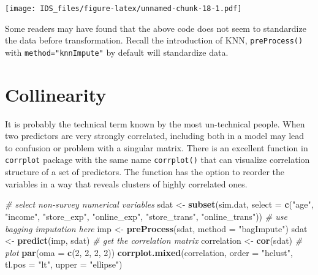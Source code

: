 \documentclass[12pt,]{krantz}
\makeatletter
\newenvironment{Shaded}{\begin{snugshade}}{\end{snugshade}}
\newcommand{\CommentTok}[1]{\textcolor[rgb]{0.37,0.37,0.37}{\textit{#1}}}
\newcommand{\DataTypeTok}[1]{\textcolor[rgb]{0.27,0.27,0.27}{#1}}
\newcommand{\DecValTok}[1]{\textcolor[rgb]{0.06,0.06,0.06}{#1}}
\newcommand{\KeywordTok}[1]{\textcolor[rgb]{0.27,0.27,0.27}{\textbf{#1}}}
\newcommand{\NormalTok}[1]{#1}
\newcommand{\StringTok}[1]{\textcolor[rgb]{0.5,0.5,0.5}{#1}}
\newenvironment{kframe}{%
\medskip{}
\setlength{\fboxsep}{.8em}
 \def\at@end@of@kframe{}%
 \ifinner\ifhmode%
  \def\at@end@of@kframe{\end{minipage}}%
  \begin{minipage}{\columnwidth}%
 \fi\fi%
 \def\FrameCommand##1{\hskip\@totalleftmargin \hskip-\fboxsep
 \colorbox{shadecolor}{##1}\hskip-\fboxsep
     \hskip-\linewidth \hskip-\@totalleftmargin \hskip\columnwidth}%
 \MakeFramed {\advance\hsize-\width
   \@totalleftmargin\z@ \linewidth\hsize
   \@setminipage}}%
 {\par\unskip\endMakeFramed%
 \at@end@of@kframe}
\renewenvironment{Shaded}{\begin{kframe}}{\end{kframe}}
\makeatother
\begin{document}
\texttt{[image: IDS\_files/figure-latex/unnamed-chunk-18-1.pdf]}

Some readers may have found that the above code does not seem to standardize the data before transformation. Recall the introduction of KNN, \texttt{preProcess()} with \texttt{method="knnImpute"} by default will standardize data.

\hypertarget{collinearity}{%
\section{Collinearity}\label{collinearity}}

It is probably the technical term known by the most un-technical people. When two predictors are very strongly correlated, including both in a model may lead to confusion or problem with a singular matrix. There is an excellent function in \texttt{corrplot} package with the same name \texttt{corrplot()} that can visualize correlation structure of a set of predictors. The function has the option to reorder the variables in a way that reveals clusters of highly correlated ones.

\begin{Shaded}
\begin{Highlighting}[]
\CommentTok{# select non-survey numerical variables}
\NormalTok{sdat <-}\StringTok{ }\KeywordTok{subset}\NormalTok{(sim.dat, }\DataTypeTok{select =} \KeywordTok{c}\NormalTok{(}\StringTok{"age"}\NormalTok{, }\StringTok{"income"}\NormalTok{, }\StringTok{"store_exp"}\NormalTok{, }
    \StringTok{"online_exp"}\NormalTok{, }\StringTok{"store_trans"}\NormalTok{, }\StringTok{"online_trans"}\NormalTok{))}
\CommentTok{# use bagging imputation here}
\NormalTok{imp <-}\StringTok{ }\KeywordTok{preProcess}\NormalTok{(sdat, }\DataTypeTok{method =} \StringTok{"bagImpute"}\NormalTok{)}
\NormalTok{sdat <-}\StringTok{ }\KeywordTok{predict}\NormalTok{(imp, sdat)}
\CommentTok{# get the correlation matrix}
\NormalTok{correlation <-}\StringTok{ }\KeywordTok{cor}\NormalTok{(sdat)}
\CommentTok{# plot}
\KeywordTok{par}\NormalTok{(}\DataTypeTok{oma =} \KeywordTok{c}\NormalTok{(}\DecValTok{2}\NormalTok{, }\DecValTok{2}\NormalTok{, }\DecValTok{2}\NormalTok{, }\DecValTok{2}\NormalTok{))}
\KeywordTok{corrplot.mixed}\NormalTok{(correlation, }\DataTypeTok{order =} \StringTok{"hclust"}\NormalTok{, }\DataTypeTok{tl.pos =} \StringTok{"lt"}\NormalTok{, }
    \DataTypeTok{upper =} \StringTok{"ellipse"}\NormalTok{)}
\end{Highlighting}
\end{Shaded}
\end{document}

